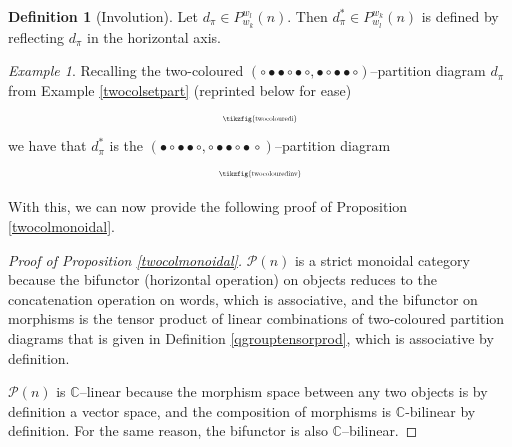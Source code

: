 \documentclass{article}
\theoremstyle{plain}
\theoremstyle{definition}
\newtheorem{definition}[theorem]{Definition}
\theoremstyle{remark}
\newtheorem{example}[theorem]{Example}
\begin{document}
\begin{definition}[Involution] \label{qgroupinvolution}
Let $d_\pi \in P_{w_k}^{w_l}(n)$.
Then $d_\pi^{*} \in P_{w_l}^{w_k}(n)$
is defined by reflecting $d_\pi$ in the horizontal axis.
\end{definition}

\begin{example}
Recalling the two-coloured 
$(\circ \bullet \bullet \circ \bullet \, \circ, 
		\bullet \circ \bullet \bullet \circ)$--partition diagram $d_\pi$
from Example \ref{twocolsetpart}
(reprinted below for ease)
\begin{equation}
\begin{aligned}
	\scalebox{0.5}{\tikzfig{twocolouredi}}
\end{aligned}
\end{equation}
we have that $d_\pi^{*}$ is the 
$(\bullet \circ \bullet \bullet \circ,
\circ \bullet \bullet \circ \bullet \, \circ)$--partition diagram
\begin{equation}
\begin{aligned}
	\scalebox{0.5}{\tikzfig{twocolouredinv}}
\end{aligned}
\end{equation}
\end{example}

With this, we can now provide the following proof of Proposition \ref{twocolmonoidal}.

\begin{proof}[Proof of Proposition \ref{twocolmonoidal}]
	$\mathcal{P}(n)$ is a strict monoidal category
	because the bifunctor (horizontal operation) 
	on objects reduces to the concatenation operation on 
	words, which is associative, and
	the bifunctor on morphisms is 
	the tensor product of linear combinations of two-coloured partition diagrams
	that is given in Definition \ref{qgrouptensorprod},
	which is associative by definition.

	$\mathcal{P}(n)$ is $\mathbb{C}$--linear because the morphism space 
	between any two objects is by definition a vector space,
	and the composition of morphisms is $\mathbb{C}$-bilinear 
	by definition.
	For the same reason, the bifunctor is also $\mathbb{C}$--bilinear.	
\end{proof}
\end{document}
